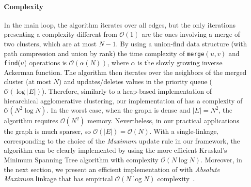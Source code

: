 \paragraph*{Complexity} In the main loop, the algorithm iterates over all edges, but the only iterations presenting a complexity different from $\mathcal{O}(1)$ are the ones involving a merge of two clusters, which are at most $N-1$. By using a union-find data structure (with path compression and union by rank) the time complexity of \texttt{merge}$(u, v)$ and \texttt{find}($u$) operations is $\mathcal{O}(\alpha(N))$, where $\alpha$ is the slowly growing inverse Ackerman function. The algorithm then iterates over the neighbors of the merged cluster (at most $N$) and updates/deletes values in the priority queue ($\mathcal{O}(\log |E|)$). Therefore, similarly to a heap-based implementation of hierarchical agglomerative clustering, our implementation of \algname{} has a complexity of $\mathcal{O}(N^2 \log N)$. In the worst case, when the graph is dense and $|E|=N^2$, the algorithm requires $\mathcal{O}(N^2)$ memory. Nevertheless, in our practical applications the graph is much sparser, so $\mathcal{O}(|E|)=\mathcal{O}(N)$. 
With a single-linkage, corresponding to the choice of the \emph{Maximum} update rule in our framework, the algorithm can be clearly implemented by using the more efficient Kruskal's Minimum Spanning Tree algorithm with complexity $\mathcal{O}(N \log N)$. 
Moreover, in the next section, we present an efficient implementation of \algname{} with \emph{Absolute Maximum} linkage that has empirical $\mathcal{O}(N \log N)$ complexity~\cite{wolf2018mutex}.


